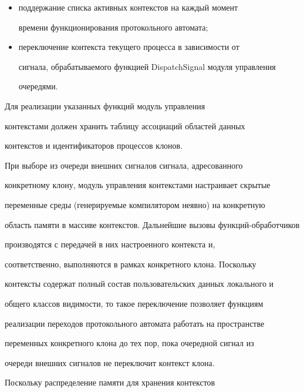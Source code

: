       \begin{itemize}


      \item  поддержание списка активных контекстов на каждый момент 


времени функционирования протокольного автомата;


      \item переключение контекста текущего процесса в зависимости от 


сигнала, обрабатываемого функцией DispatchSignal модуля управления 


очередями.


      \end{itemize}


      


      Для реализации указанных функций модуль управления 


контекстами должен хранить таблицу ассоциаций областей данных 


контекстов и идентификаторов процессов клонов. 


      


      При выборе из очереди внешних сигналов сигнала, адресованного 


конкретному клону, модуль управления контекстами настраивает скрытые 


переменные среды (генерируемые компилятором неявно) на конкретную 


область памяти в массиве контекстов. Дальнейшие вызовы функций-обработчиков 


производятся с передачей в них настроенного контекста и, 


соответственно, выполняются в рамках конкретного клона. Поскольку 


контексты содержат полный состав пользовательских данных локального и 


общего классов видимости, то  такое переключение позволяет функциям 


реализации переходов протокольного автомата работать на пространстве 


переменных конкретного клона до тех пор, пока очередной сигнал из 


очереди внешних сигналов не переключит контекст клона.


      


      Поскольку распределение памяти для хранения контекстов 


